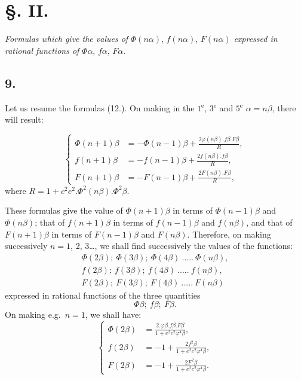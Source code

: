 \documentclass{article}
\begin{document}
\section*{§. II.}

\emph{Formulas which give the values of} $\Phi(n\alpha)$, $f(n\alpha)$, $F(n\alpha)$ \emph{expressed in rational functions of} $\Phi\alpha$, $f\alpha$, $F\alpha$.

\subsection*{9.}

Let us resume the formulas (12.). On making in the $1{}^{\mathrm{e}}$, $3{}^{\mathrm{e}}$ and $5{}^{\mathrm{e}}$ $\alpha=n\beta$, there will result:

\[ \left\{\begin{aligned} \Phi(n+1)\beta&=-\Phi(n-1)\beta+\frac{2\varphi(n\beta).f\beta.F\beta}{R},\\ f(n+1)\beta&=-f(n-1)\beta+\frac{2f(n\beta).f\beta}{R},\\ F(n+1)\beta&=-F(n-1)\beta+\frac{2F(n\beta).F\beta}{R}, \end{aligned}\right. \tag{34.} \]
where $R=1+c^{2}e^{2}.\Phi^{2}(n\beta).\Phi^{2}\beta$.

These formulas give the value of $\Phi(n+1)\beta$ in terms of $\Phi(n-1)\beta$ and $\Phi(n\beta)$; that of $f(n+1)\beta$ in terms of $f(n-1)\beta$ and $f(n\beta)$, and that of $F(n+1)\beta$ in terms of $F(n-1)\beta$ and $F(n\beta)$. Therefore, on making successively $n=1$, 2, 3\ldots, we shall find successively the values of the functions:
\[ \begin{gathered} \Phi(2\beta);\ \Phi(3\beta);\ \Phi(4\beta)\ .....\ \Phi(n\beta),\\ f(2\beta);\ f(3\beta);\ f(4\beta)\ .....\ f(n\beta),\\ F(2\beta);\ F(3\beta);\ F(4\beta)\ .....\ F(n\beta) \end{gathered} \]
expressed in rational functions of the three quantities
\[ \Phi\beta;\ f\beta;\ F\beta. \]
On making e.g.\ $n=1$, we shall have:
\[ \left\{\begin{aligned} \Phi(2\beta)&=\frac{2.\varphi\beta.f\beta.F\beta}{1+e^{2}c^{2}\varphi^{4}\beta},\\ f(2\beta)&=-1+\frac{2f^{2}\beta}{1+e^{2}c^{2}\varphi^{4}\beta},\\ F(2\beta)&=-1+\frac{2F^{2}\beta}{1+e^{2}c^{2}\varphi^{4}\beta}. \end{aligned}\right. \tag{35.} \]
\end{document}
